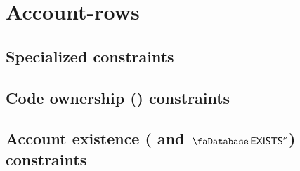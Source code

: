 \section{Account-rows}
\subsection{Specialized constraints \lispTodo{}}                                              \label{hub: account: state access}              
\subsection{Code ownership (\accHasCode) constraints \lispDone{}}                             \label{hub: account: empty code}                
\subsection{Account existence (\accExists{} and $\accExists\new$) constraints \lispDone{}}    \label{hub: account: account existence}         
